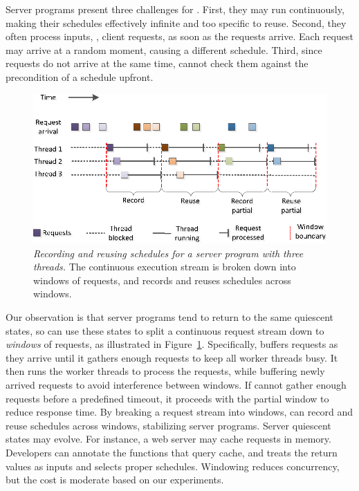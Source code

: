 Server programs present three challenges for \smt. First, they may run
continuously, making their schedules effectively infinite and too specific
to reuse.  Second, they often process inputs, \ie, client requests, as
soon as the requests arrive. Each request may arrive at a random moment,
causing a different schedule. Third, since requests do not arrive at the
same time, \peregrine cannot check them against the precondition of a
schedule upfront.

\begin{figure}[t]
\includegraphics[width=\linewidth]{peregrine/figures/window-idea}
\vspace{-.3in}
\caption{{\em Recording and reusing schedules for a server program with
    three threads.}  The continuous execution stream is broken down into
  windows of requests, and \peregrine records and reuses schedules across
  windows.} \label{fig:window}
\end{figure}

Our observation is that server programs tend to return to the same
quiescent states, so \peregrine can use these states to split a continuous
request stream down to \emph{windows} of requests, as illustrated in
Figure~\ref{fig:window}.  Specifically, \peregrine buffers requests as they
arrive until it gathers enough requests to keep all worker threads busy.
It then runs the worker threads to process the requests, while buffering
newly arrived requests to avoid interference between windows.  If \peregrine
cannot gather enough requests before a predefined timeout, it proceeds
with the partial window to reduce response time.  By breaking a request
stream into windows, \peregrine can record and reuse schedules across
windows, stabilizing server programs.  
Server quiescent states may evolve.  For instance, a web server may cache
requests in memory.  Developers can annotate the functions that query
cache, and \peregrine treats the return values as inputs and selects proper
schedules.
Windowing reduces concurrency, but the cost is moderate based on our 
experiments.


